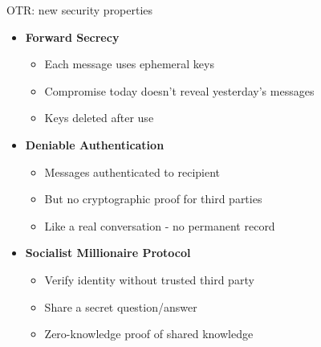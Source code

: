 \documentclass[aspectratio=169, lualatex, handout]{beamer}
\begin{document}
\begin{frame}{OTR: new security properties}
	\begin{itemize}
		\item \textbf{Forward Secrecy}
		      \begin{itemize}
			      \item Each message uses ephemeral keys
			      \item Compromise today doesn't reveal yesterday's messages
			      \item Keys deleted after use
		      \end{itemize}
		\item \textbf{Deniable Authentication}
		      \begin{itemize}
			      \item Messages authenticated to recipient
			      \item But no cryptographic proof for third parties
			      \item Like a real conversation - no permanent record
		      \end{itemize}
		\item \textbf{Socialist Millionaire Protocol}
		      \begin{itemize}
			      \item Verify identity without trusted third party
			      \item Share a secret question/answer
			      \item Zero-knowledge proof of shared knowledge
		      \end{itemize}
	\end{itemize}
\end{frame}
\end{document}
